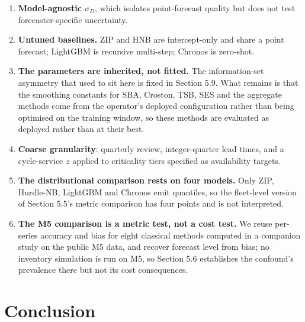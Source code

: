\documentclass[11pt]{article}
\begin{document}
\begin{enumerate}
  regime crossover at \$1{,}600 is a consequence of the assumed \$100 stockout
  penalty; a different penalty moves the boundary, though not the qualitative
  result.
\item \textbf{Model-agnostic $\sigma_{D}$}, which isolates point-forecast
  quality but does not test forecaster-specific uncertainty.
\item \textbf{Untuned baselines.} ZIP and HNB are intercept-only and share a
  point forecast; LightGBM is recursive multi-step; Chronos is zero-shot.
\item \textbf{The parameters are inherited, not fitted.} The information-set
  asymmetry that used to sit here is fixed in Section 5.9. What remains is that
  the smoothing constants for SBA, Croston, TSB, SES and the aggregate methods
  come from the operator's deployed configuration rather than being optimised
  on the training window, so these methods are evaluated as deployed rather
  than at their best.
\item \textbf{Coarse granularity}: quarterly review, integer-quarter lead
  times, and a cycle-service $z$ applied to criticality tiers specified as
  availability targets.
\item \textbf{The distributional comparison rests on four models.} Only ZIP,
  Hurdle-NB, LightGBM and Chronos emit quantiles, so the fleet-level version of
  Section 5.5's metric comparison has four points and is not interpreted.
\item \textbf{The M5 comparison is a metric test, not a cost test.} We reuse
  per-series accuracy and bias for eight classical methods computed in a
  companion study on the public M5 data, and recover forecast level from bias;
  no inventory simulation is run on M5, so Section 5.6 establishes the
  confound's prevalence there but not its cost consequences.
\end{enumerate}

\section{Conclusion}
\end{document}
